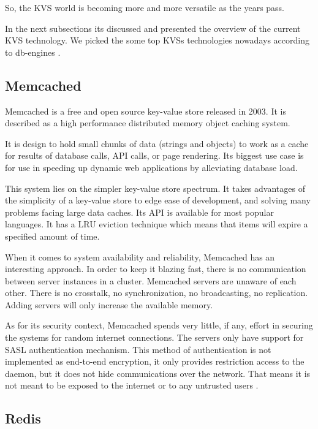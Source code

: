 So, the \gls{KVS} world is becoming more and more versatile as the years pass.

In the next subsections its discussed and presented the overview of the current \gls{KVS} technology. We picked the some top KVSs technologies nowadays according to db-engines \cite{db-engine:2}.

\subsection{Memcached} %
\label{ssec:memcached}

Memcached \cite{memcached:1} is a free and open source key-value store released in 2003. It is described as a high performance distributed memory object caching system.

It is design to hold small chunks of data (strings and objects) to work as a cache for results of database calls, API calls, or page rendering. Its biggest use case is for use in speeding up dynamic web applications by alleviating database load.

This system lies on the simpler key-value store spectrum. It takes advantages of the simplicity of a key-value store to edge ease of development, and solving many problems facing large data caches. Its API is available for most popular languages. It has a \gls{LRU} eviction technique which means that items will expire a specified amount of time. 

When it comes to system availability and reliability, Memcached has an interesting approach. In order to keep it blazing fast, there is no communication between server instances in a cluster. Memcached servers are unaware of each other. There is no crosstalk, no synchronization, no broadcasting, no replication. Adding servers will only increase the available memory.

As for its security context, Memcached spends very little, if any, effort in securing the systems for random internet connections. The servers only have support for SASL \cite{sasl:1} authentication mechanism. This method of authentication is not implemented as end-to-end encryption, it only provides restriction access to the daemon, but it does not hide communications over the network. That means it is not meant to be exposed to the internet or to any untrusted users \cite{memcached:2}.

\subsection{Redis} %
\label{ssec:redis}

